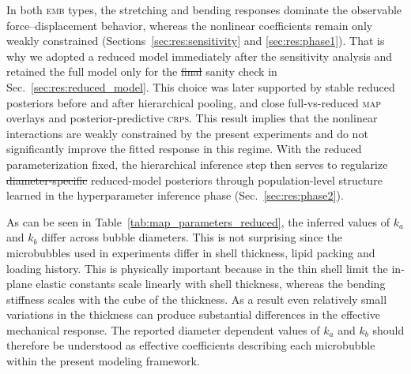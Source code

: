 \documentclass[%
 aip,
 jcp,
 amsmath,amssymb,
 preprint,%
]{revtex4-1}
\makeatletter
\providecommand{\DIFadd}[1]{{\protect\color{blue}\uwave{#1}}} %
\providecommand{\DIFdel}[1]{{\protect\color{red}\sout{#1}}} %
\providecommand{\DIFaddbegin}{} %
\providecommand{\DIFaddend}{} %
\providecommand{\DIFdelbegin}{} %
\providecommand{\DIFdelend}{} %
\let\sout@orig\sout %
\renewcommand{\sout}[1]{\ifmmode\text{\sout@orig{\ensuremath{#1}}}\else\sout@orig{#1}\fi} %
\makeatother
\begin{document}
In both \textsc{emb} types, the stretching and bending responses dominate the observable force--displacement behavior, whereas the nonlinear coefficients remain only weakly constrained (Sections~\ref{sec:res:sensitivity} and \ref{sec:res:phase1}). That is why we adopted a reduced model immediately after the sensitivity analysis and retained the full model only for the \DIFdelbegin \DIFdel{final }\DIFdelend \DIFaddbegin \DIFadd{spectroscopy }\DIFaddend sanity check in Sec.~\ref{sec:res:reduced_model}. This choice was later supported by stable reduced posteriors before and after hierarchical pooling, and close full-vs-reduced \textsc{map} overlays and posterior-predictive \textsc{crps}. This result implies that the nonlinear interactions are weakly constrained by the present experiments and do not significantly improve the fitted response in this regime. With the reduced parameterization fixed, the hierarchical inference step then serves to regularize \DIFdelbegin \DIFdel{diameter-specific }\DIFdelend reduced-model posteriors through population-level structure learned in the hyperparameter inference phase (Sec.~\ref{sec:res:phase2}).

As can be seen in Table~\ref{tab:map_parameters_reduced}, the inferred values of $k_a$ and $k_b$ differ across bubble diameters. This is not surprising since the microbubbles used in experiments differ in shell thickness, lipid packing and loading history. This is physically important because in the thin shell limit the in-plane elastic constants scale linearly with shell thickness, whereas the bending stiffness scales with the cube of the thickness. As a result even relatively small variations in the thickness can produce substantial differences in the effective mechanical response. The reported diameter dependent values of $k_a$ and $k_b$ should therefore be understood as effective coefficients describing each microbubble within the present modeling framework.
\end{document}
